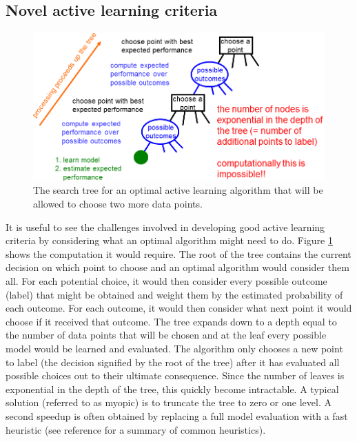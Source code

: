 \documentclass[prd,nofootbib,floatfix,11pt,tightenlines,nofootinbib]{revtex4}
\begin{document}
\subsection{Novel active learning criteria}

\begin{figure}[t]
\centerline{\includegraphics[scale=0.4]{searchtree.png}}
\caption{The search tree for an optimal active learning algorithm that will
  be allowed to choose two more data points.}
\label{fig:searchtree}
\end{figure}

It is useful to see the challenges involved in developing good active
learning criteria by considering what an optimal algorithm might need to
do.  Figure \ref{fig:searchtree} shows the computation it would require.
The root of the tree contains the current decision on which point to choose
and an optimal algorithm would consider them all.  For each 
potential choice, it
would then consider every possible outcome (label) that might be obtained
and weight them by the estimated probability of each outcome.  For each
outcome, it would then consider what next point it would choose if it
received that outcome.  The tree expands down to a depth equal to the
number of data points that will be chosen and at the leaf every possible
model would be learned and evaluated.  
The algorithm only chooses a new point to label (the decision signified by the
root of the tree) after it has evaluated all possible choices out to their
ultimate consequence.
Since the number of leaves is
exponential in the depth of the tree, this quickly become intractable.  A
typical solution (referred to as myopic) is to truncate the tree to zero or
one level.  A second speedup is often obtained by replacing a full model
evaluation with a fast heuristic (see reference
\cite{Settles09} for a summary of
common heuristics).
\end{document}

